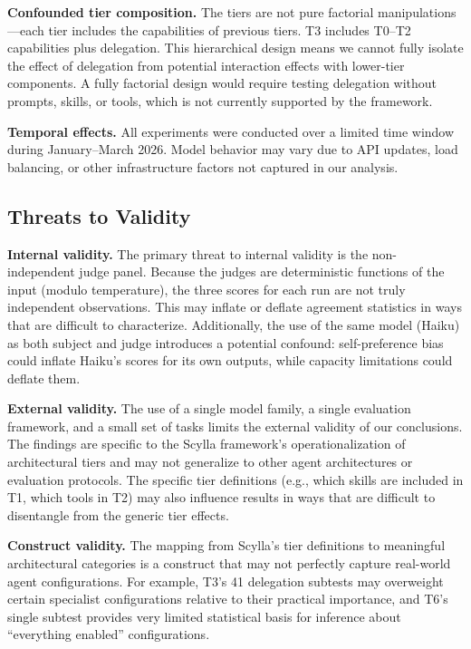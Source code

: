 \documentclass[11pt]{article}
\begin{document}
\textbf{Confounded tier composition.} The tiers are not pure factorial
manipulations---each tier includes the capabilities of previous tiers. T3
includes T0--T2 capabilities plus delegation. This hierarchical design means
we cannot fully isolate the effect of delegation from potential interaction
effects with lower-tier components. A fully factorial design would require
testing delegation without prompts, skills, or tools, which is not currently
supported by the framework.

\textbf{Temporal effects.} All experiments were conducted over a limited
time window during January--March 2026. Model behavior may vary due to API
updates, load balancing, or other infrastructure factors not captured in our
analysis.

\subsection{Threats to Validity}
\label{sec:threats}

\textbf{Internal validity.} The primary threat to internal validity is the
non-independent judge panel. Because the judges are deterministic functions
of the input (modulo temperature), the three scores for each run are not
truly independent observations. This may inflate or deflate agreement
statistics in ways that are difficult to characterize. Additionally, the
use of the same model (Haiku) as both subject and judge introduces a
potential confound: self-preference bias could inflate Haiku's scores for
its own outputs, while capacity limitations could deflate them.

\textbf{External validity.} The use of a single model family, a single
evaluation framework, and a small set of tasks limits the external validity
of our conclusions. The findings are specific to the Scylla framework's
operationalization of architectural tiers and may not generalize to other
agent architectures or evaluation protocols. The specific tier definitions
(e.g., which skills are included in T1, which tools in T2) may also
influence results in ways that are difficult to disentangle from the
generic tier effects.

\textbf{Construct validity.} The mapping from Scylla's tier definitions to
meaningful architectural categories is a construct that may not perfectly
capture real-world agent configurations. For example, T3's 41 delegation
subtests may overweight certain specialist configurations relative to their
practical importance, and T6's single subtest provides very limited
statistical basis for inference about ``everything enabled'' configurations.
\end{document}
